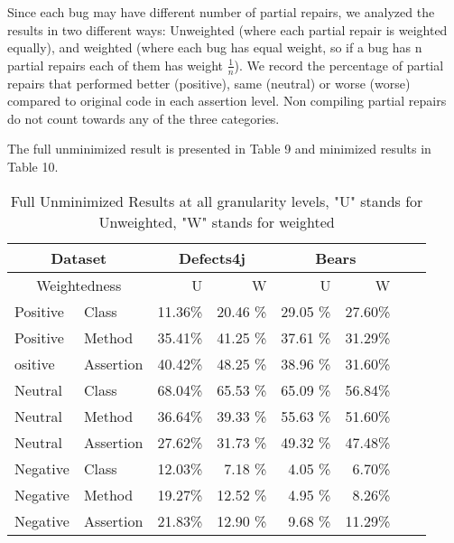 \documentclass[sigconf, timestamp-false, anonymous=true]{acmart}
\begin{document}
Since each bug may have different 
number of partial repairs, we analyzed the results in two different ways: 
Unweighted (where each partial repair is weighted equally), and weighted (where each bug 
has equal weight, so if a bug has n partial repairs each of them has weight 
$\frac{1}{n}$). We record the percentage of partial repairs that performed better (positive), same (neutral)
or worse (worse) compared to original code in each assertion level. Non compiling
partial repairs do not count towards any of the three categories.

The full unminimized result is presented in Table 9 and minimized results in Table 10.

\begin{table}
{\begin{center}
\begin{tabular}{| l | l | r | r | r | r | r | r |}
\hline
\multicolumn{2}{|c|}{Dataset} &\multicolumn{2}{|c|}{Defects4j} & \multicolumn{2}{|c|}{Bears} \\
\hline
\multicolumn{2}{|c|}{Weightedness} & U & W & U & W  \\
\hline
Positive & Class & 11.36\% & 20.46 \% & 29.05 \% & 27.60\%  \\
Positive & Method & 35.41\% & 41.25 \% & 37.61 \% & 31.29\%  \\
ositive & Assertion & 40.42\% & 48.25 \% & 38.96 \% & 31.60\%  \\ 
\hline
Neutral & Class & 68.04\% & 65.53 \% & 65.09 \% & 56.84\% \\
Neutral & Method & 36.64\% & 39.33 \% & 55.63 \% & 51.60\%  \\
Neutral & Assertion & 27.62\% & 31.73 \% & 49.32 \% &  47.48\%  \\ 
\hline
Negative & Class & 12.03\% & 7.18 \% & 4.05 \% & 6.70\%  \\
Negative & Method & 19.27\% & 12.52 \% & 4.95 \% & 8.26\%  \\
Negative & Assertion & 21.83\% & 12.90 \% & 9.68 \% &  11.29\%  \\ 
\hline
\end{tabular}
\end{center}}
\caption{Full Unminimized Results at all granularity levels, "U" stands for Unweighted, "W" stands for weighted}
\end{table}
\end{document}
